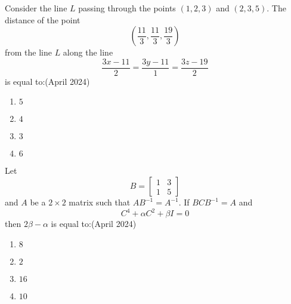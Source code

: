 \iffalse
\title{Assignment}
\author{EE24BTECH11035}
\section{mcq-single}
\fi


    \item Consider the line $L$ passing through the points $(1, 2, 3)$ and $(2, 3, 5)$. The distance of the point 
    \begin{equation*}
    \left( \frac{11}{3}, \frac{11}{3}, \frac{19}{3} \right)
    \end{equation*}
    from the line $L$ along the line 
    \begin{equation*}
    \frac{3x - 11}{2} = \frac{3y - 11}{1} = \frac{3z - 19}{2}
    \end{equation*}
is equal to:\hfill{(April 2024)}
    \begin{enumerate}
        \item $5$
        \item $4$
        \item $3$
        \item $6$
    \end{enumerate}
    \item Let 
    \begin{equation*}
    B = \begin{bmatrix} 1 & 3 \\ 1 & 5 \end{bmatrix}
    \end{equation*}
    and $A$ be a $2 \times 2$ matrix such that $AB^{-1} = A^{-1}$. If $BCB^{-1} = A$ and 
    \begin{equation*}
    C^4 + \alpha C^2 + \beta I = 0
    \end{equation*}
then $2\beta - \alpha$ is equal to:\hfill{(April 2024)}
    \begin{enumerate}
        \item $8$
        \item $2$
        \item $16$
        \item $10$
    \end{enumerate}
		
